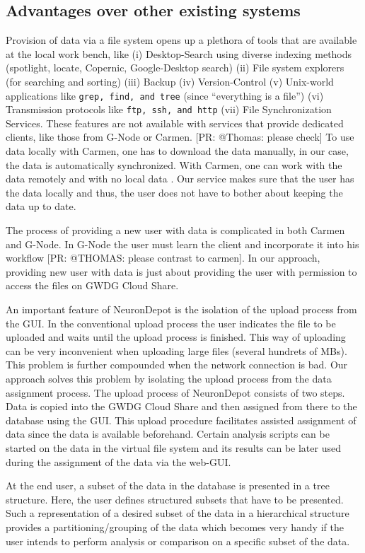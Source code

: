 \documentclass{frontiersSCNS} %
\newcommand{\pr}[1]{[\textcolor{YellowOrange}{PR: #1}]}
\begin{document}
\subsection{Advantages over other existing systems}
Provision of data via a file system opens up a plethora of tools that are
available at the local work bench, like (i) Desktop-Search using diverse
indexing methods (spotlight, locate, Copernic, Google-Desktop search) (ii) File
system explorers (for  searching and sorting) (iii) Backup (iv) Version-Control
(v) Unix-world applications like \texttt{grep, find, and tree} (since
“everything is a file”) (vi) Transmission protocols like \texttt{ftp, ssh, and
http} (vii) File Synchronization Services. These features are not available
with services that provide dedicated clients, like those from G-Node or Carmen.
\pr{@Thomas: please check}
To use data locally with Carmen, one has to download the data manually, in our
case, the data is automatically synchronized. With Carmen, one can work with
the data remotely and with no local data \citep{austin_carmen:_2011}. Our service
makes sure that the user has the data locally and thus, the user does not have
to bother about keeping the data up to date.

The process of providing a new user with data is complicated in both Carmen and
G-Node. In G-Node the user must learn the client and incorporate it into his
workflow \pr{@THOMAS: please contrast to carmen}. In our approach, providing
new user with data is just about providing the user with permission to access
the files on GWDG Cloud Share.

An important feature of NeuronDepot is the isolation of the upload process from
the GUI. In the conventional upload process the user indicates the file to be
uploaded and waits until the upload process is finished. This way of uploading
can be very inconvenient when uploading large files (several hundrets of MBs).
This problem is further compounded when the network connection is bad. Our
approach solves this problem by isolating the upload process from the data
assignment process. The upload process of NeuronDepot consists of two steps.
Data is copied into the GWDG Cloud Share and then assigned from there to the
database using the GUI. This upload procedure facilitates assisted assignment
of data since the data is available beforehand. Certain analysis scripts can be
started on the data in the virtual file system and its results can be later
used during the assignment of the data via the web-GUI.

At the end user, a subset of the data in the database is presented in a tree
structure. Here, the user defines structured subsets that have to be presented.
Such a representation of a desired subset of the data in a hierarchical
structure provides a partitioning/grouping of the data which becomes very handy
if the user intends to perform analysis or comparison on a specific subset of
the data.
\end{document}
